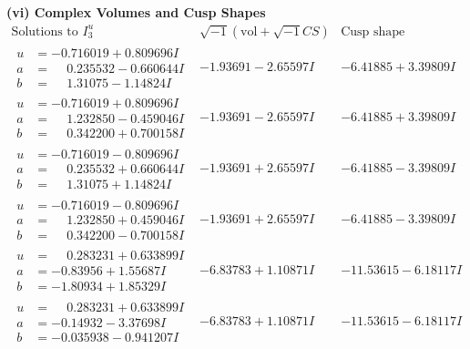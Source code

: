 \documentclass[1p]{elsarticle_modified}
\theoremstyle{definition}
\newcommand{\I}{\sqrt{-1}}
\begin{document}
\newpage\flushleft \textbf{(vi) Complex Volumes and Cusp Shapes}
$$\begin{array}{c|c|c}  
\text{Solutions to }I^u_{3}& \I (\text{vol} + \sqrt{-1}CS) & \text{Cusp shape}\\
 \hline 
\begin{aligned}
u &= -0.716019 + 0.809696 I \\
a &= \phantom{-}0.235532 - 0.660644 I \\
b &= \phantom{-}1.31075 - 1.14824 I\end{aligned}
 & -1.93691 - 2.65597 I & -6.41885 + 3.39809 I \\ \hline\begin{aligned}
u &= -0.716019 + 0.809696 I \\
a &= \phantom{-}1.232850 - 0.459046 I \\
b &= \phantom{-}0.342200 + 0.700158 I\end{aligned}
 & -1.93691 - 2.65597 I & -6.41885 + 3.39809 I \\ \hline\begin{aligned}
u &= -0.716019 - 0.809696 I \\
a &= \phantom{-}0.235532 + 0.660644 I \\
b &= \phantom{-}1.31075 + 1.14824 I\end{aligned}
 & -1.93691 + 2.65597 I & -6.41885 - 3.39809 I \\ \hline\begin{aligned}
u &= -0.716019 - 0.809696 I \\
a &= \phantom{-}1.232850 + 0.459046 I \\
b &= \phantom{-}0.342200 - 0.700158 I\end{aligned}
 & -1.93691 + 2.65597 I & -6.41885 - 3.39809 I \\ \hline\begin{aligned}
u &= \phantom{-}0.283231 + 0.633899 I \\
a &= -0.83956 + 1.55687 I \\
b &= -1.80934 + 1.85329 I\end{aligned}
 & -6.83783 + 1.10871 I & -11.53615 - 6.18117 I \\ \hline\begin{aligned}
u &= \phantom{-}0.283231 + 0.633899 I \\
a &= -0.14932 - 3.37698 I \\
b &= -0.035938 - 0.941207 I\end{aligned}
 & -6.83783 + 1.10871 I & -11.53615 - 6.18117 I \\ \hline\begin{aligned}

\end{aligned}
\end{array}$$
\end{document}
